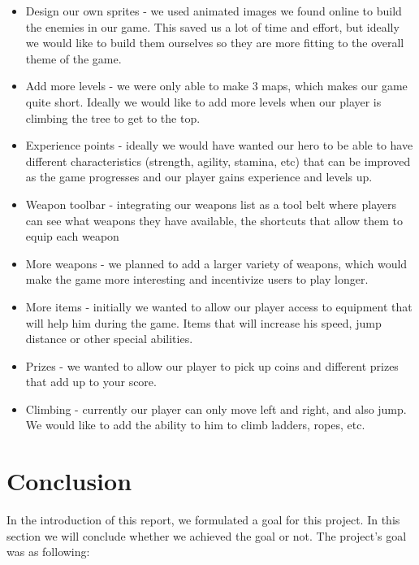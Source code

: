 \documentclass[12p]{article}
\begin{document}
\begin{itemize}
    \item Design our own sprites - we used animated images we found online to build the enemies in our game. This saved us a lot of time and effort, but ideally we would like to build them ourselves so they are more fitting to the overall theme of the game.
    \item Add more levels - we were only able to make 3 maps, which makes our game quite short. Ideally we would like to add more levels when our player is climbing the tree to get to the top.
    \item Experience points - ideally we would have wanted our hero to be able to have different characteristics (strength, agility, stamina, etc) that can be improved as the game progresses and our player gains experience and levels up.
    \item Weapon toolbar - integrating our weapons list as a tool belt where players can see what weapons they have available, the shortcuts that allow them to equip each weapon 
    \item More weapons - we planned to add a larger variety of weapons, which would make the game more interesting and incentivize users to play longer.
    \item More items - initially we wanted to allow our player access to equipment that will help him during the game. Items that will increase his speed, jump distance or other special abilities.
    \item Prizes - we wanted to allow our player to pick up coins and different prizes that add up to your score.
    \item Climbing - currently our player can only move left and right, and also jump. We would like to add the ability to him to climb ladders, ropes, etc.
\end{itemize}


\newpage
\section{Conclusion}

In the introduction of this report, we formulated a goal for this project. In this section we will conclude whether we achieved the goal or not. The project's goal was as following:
\end{document}

